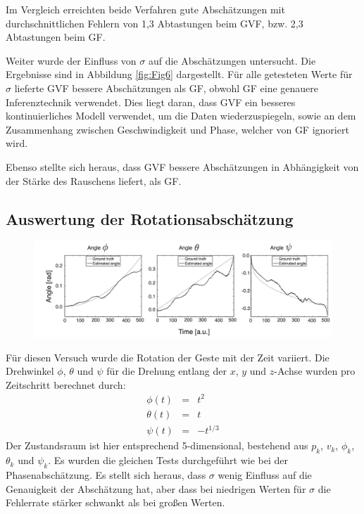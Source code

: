 \documentclass{llncs}
\begin{document}
Im Vergleich erreichten beide Verfahren gute Abschätzungen mit durchschnittlichen Fehlern von 1,3 Abtastungen beim GVF, bzw. 2,3 Abtastungen beim GF.

Weiter wurde der Einfluss von $\sigma$ auf die Abschätzungen untersucht. Die Ergebnisse sind in Abbildung \ref{fig:Fig6} dargestellt. Für alle getesteten Werte für $\sigma$ lieferte GVF bessere Abschätzungen als GF, obwohl GF eine genauere Inferenztechnik verwendet. Dies liegt daran, dass GVF ein besseres kontinuierliches Modell verwendet, um die Daten wiederzuspiegeln, sowie an dem Zusammenhang zwischen Geschwindigkeit und Phase, welcher von GF ignoriert wird.

Ebenso stellte sich heraus, dass GVF bessere Abschätzungen in Abhängigkeit von der Stärke des Rauschens liefert, als GF.

\subsection{Auswertung der Rotationsabschätzung}
\begin{figure}
\centering
\includegraphics[width=0.7\linewidth]{../Bilder/Fig8}
\caption{}
\label{fig:Fig8}
\end{figure}
Für diesen Versuch wurde die Rotation der Geste mit der Zeit variiert. Die Drehwinkel $\phi$, $\theta$ und $\psi$ für die Drehung entlang der $x$, $y$ und $z$-Achse wurden pro Zeitschritt berechnet durch:
\begin{equation}
\begin{array}{rcl}
\phi(t) & = & t^2\\
\theta(t) & = & t\\
\psi(t) & = & -t^{1/3}
\end{array}
\end{equation}
Der Zustandsraum ist hier entsprechend 5-dimensional, bestehend aus $p_k$, $v_k$, $\phi_k$, $\theta_k$ und $\psi_k$. Es wurden die gleichen Tests durchgeführt wie bei der Phasenabschätzung.
Es stellt sich heraus, dass $\sigma$ wenig Einfluss auf die Genauigkeit der Abschätzung hat, aber dass bei niedrigen Werten für $\sigma$ die Fehlerrate stärker schwankt als bei großen Werten.
\end{document}
